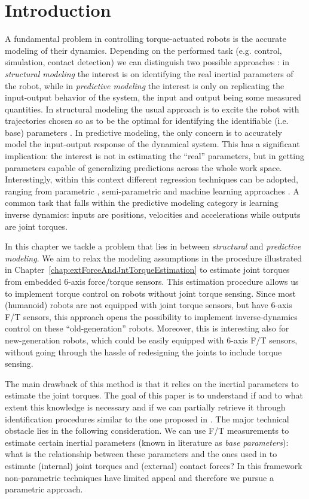 \section{Introduction}
A fundamental problem in controlling torque-actuated robots is the accurate modeling of their dynamics. Depending on the performed task (e.g. control, simulation, contact detection) we can distinguish two possible approaches \citep{handbookident}: in \emph{structural modeling} the interest is on identifying the real inertial parameters of the robot, while in \emph{predictive modeling} the interest is only on replicating the input-output behavior of the system, the input and output being some measured quantities. 
In structural modeling the usual approach is to excite the robot with trajectories chosen so as to be the optimal for identifying the identifiable (i.e. base) parameters \citep{armstrong}. 
In predictive modeling, the only concern is to accurately model the input-output response of the dynamical system. This has a significant implication: the interest is not in estimating the ``real'' parameters, but in getting parameters capable of generalizing predictions across the whole work space. 
Interestingly, within this context different regression techniques can be adopted, ranging from parametric \citep{handbookident}, semi-parametric \citep{Nguyen-Tuong2010} and machine learning approaches \citep{Fumagalli_FMLILR_2010}. A common task that falls within the predictive modeling category is learning inverse dynamics: inputs are positions, velocities and accelerations while outputs are joint torques. 

In this chapter we tackle a problem that lies in between \emph{structural} and \emph{predictive modeling}. We aim to relax the modeling assumptions in the procedure illustrated in Chapter~\ref{chap:extForceAndJntTorqueEstimation} to estimate joint torques from embedded 6-axis force/torque sensors. This estimation procedure allows us to implement torque control on robots without joint torque sensing. Since most (humanoid) robots are not equipped with joint torque sensors, but have 6-axis F/T sensors, this approach opens the possibility to implement inverse-dynamics control on these ``old-generation'' robots. Moreover, this is  interesting also for new-generation robots, which could be easily equipped with 6-axis F/T sensors, without going through the hassle of redesigning the joints to include torque sensing. 

The main drawback of this method is that it relies on the inertial parameters to estimate the joint torques. The goal of this paper is to understand if and to what extent this knowledge is necessary and if we can partially retrieve it through identification procedures similar to the one proposed in \citep{handbookident}. The major technical obstacle lies in the following consideration. We can use F/T measurements to estimate certain inertial parameters (known in literature as \emph{base parameters}): what is the relationship between these parameters and the ones used in \citep{Fumagalli2012} to estimate (internal) joint torques and (external) contact forces? In this framework non-parametric techniques have limited appeal and therefore we pursue a parametric approach. 


